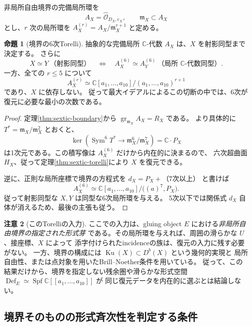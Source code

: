 \documentclass[a4paper,11pt]{ltjsarticle}
\theoremstyle{definition}
\newtheorem{theorem}{命題}[section]
\newtheorem{remark}[theorem]{注意}
\newcommand{\CC}{\mathbb C}
\newcommand{\OO}{\mathcal O}
\newcommand{\Ku}{\operatorname{Ku}}
\newcommand{\Def}{\operatorname{Def}}
\begin{document}
非局所自由境界の完備局所環を
\[
 A_X=\widehat{\OO}_{D_X,e_X},\qquad
 \mathfrak m_X\subset A_X
\]
とし、$r$ 次の局所環を $A_X^{(r)}=A_X/\mathfrak m_X^{r+1}$ と定める。

\begin{theorem}[境界の6次Torelli]\label{thm:boundary-sixth-jet}
抽象的な完備局所 $\CC$-代数 $A_X$ は、$X$ を射影同型まで決定する。
さらに
\[
 X\simeq Y\ \text{（射影同型）}
 \quad\Longleftrightarrow\quad
 A_X^{(6)}\simeq A_Y^{(6)}\ \text{（局所 $\CC$-代数同型）}.
\]
一方、全ての $r\le5$ について
\[
 A_X^{(r)}\simeq
 \CC[a_1,\ldots,a_{10}]/(a_1,\ldots,a_{10})^{r+1}
\]
であり、$X$ に依存しない。
従って最大イデアルによるこの切断の中では、6次が復元に必要な最小の次数である。
\end{theorem}

\begin{proof}
定理\ref{thm:sextic-boundary}から
$\operatorname{gr}_{\mathfrak m_X}A_X=R_X$ である。
より具体的に $T^*=\mathfrak m_X/\mathfrak m_X^2$ とおくと、
\[
 \ker\left(\operatorname{Sym}^6T^*
      \longrightarrow\mathfrak m_X^6/\mathfrak m_X^7\right)
 =\CC\cdot P_X
\]
は1次元である。この積写像は $A_X^{(6)}$ だけから内在的に決まるので、
六次超曲面 $H_X$、従って定理\ref{thm:sextic-torelli}により $X$ を復元できる。

逆に、正則な局所座標で境界の方程式を
$d_X=P_X+\text{（7次以上）}$ と書けば
\[
 A_X^{(6)}\simeq
 \CC[a_1,\ldots,a_{10}]/\bigl((a)^7,P_X\bigr).
\]
従って射影同型な $X,Y$ は同型な6次局所環を与える。
5次以下では関係式 $d_X$ 自体が消えるため、最後の主張も従う。
\end{proof}

\begin{remark}[このTorelliの入力]
ここでの入力は、gluing object $E$ における\emph{非局所自由境界の指定された形式芽}
である。その局所環を与えれば、周囲の滑らかな $U$、接座標、$X$ によって
添字付けられたincidenceの族は、復元の入力に残す必要がない。
一方、境界の構成には $\Ku(X)\subset D^b(X)$ という幾何的実現と
局所自由性、または点対象を用いたBrill--Noether条件を用いている。
従って、この結果だけから、境界を指定しない残余圏や滑らかな形式空間
$\Def_E\simeq\operatorname{Spf}\CC[[a_1,\ldots,a_{10}]]$ が
同じ復元データを内在的に選ぶとは結論しない。
\end{remark}

\subsection{境界そのものの形式斉次性を判定する条件}
\end{document}
